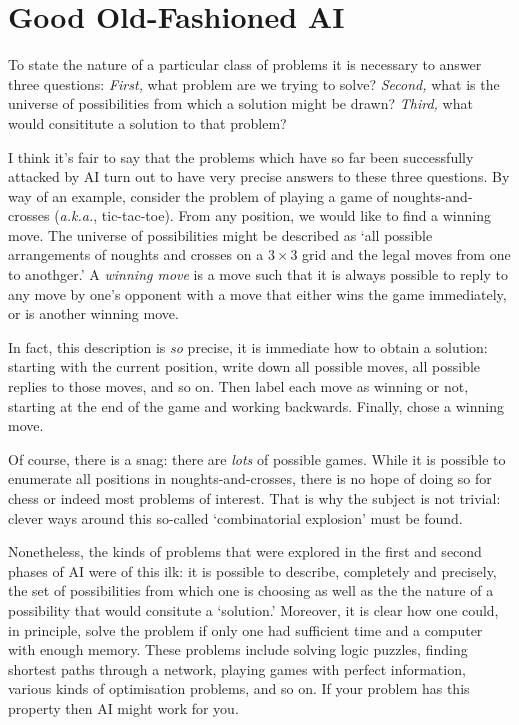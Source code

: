 \documentclass[10pt, a4paper, twocolumn]{article}
\begin{document}
\section{Good Old-Fashioned AI}

To state the nature of a particular class of problems it is necessary to answer
three questions: \emph{First,} what problem are we trying to solve?
\emph{Second,} what is the universe of possibilities from which a solution might
be drawn? \emph{Third,} what would consititute a solution to that problem?

I think it's fair to say that the problems which have so far been successfully
attacked by AI turn out to have very precise answers to these three
questions. By way of an example, consider the problem of playing a game of
noughts-and-crosses (\emph{a.k.a.}, tic-tac-toe). From any position, we would
like to find a winning move. The universe of possibilities might be described as
`all possible arrangements of noughts and crosses on a $3\times3$ grid and the legal
moves from one to anothger.' A \emph{winning move} is a move such that it is
always possible to reply to any move by one's opponent with a move that either
wins the game immediately, or is another winning move.

In fact, this description is \emph{so} precise, it is immediate how to obtain a
solution: starting with the current position, write down all possible moves, all
possible replies to those moves, and so on. Then label each move as winning or
not, starting at the end of the game and working backwards. Finally, chose a
winning move.

Of course, there is a snag: there are \emph{lots} of possible games. While it is
possible to enumerate all positions in noughts-and-crosses, there is no hope of
doing so for chess or indeed most problems of interest. That is why the subject
is not trivial: clever ways around this so-called `combinatorial explosion' must
be found.

Nonetheless, the kinds of problems that were explored in the first and second
phases of AI were of this ilk: it is possible to describe, completely and
precisely, the set of possibilities from which one is choosing as well as the
the nature of a possibility that would consitute a `solution.' Moreover, it is
clear how one could, in principle, solve the problem if only one had sufficient
time and a computer with enough memory. These problems include solving logic
puzzles, finding shortest paths through a network, playing games with perfect
information, various kinds of optimisation problems, and so on. If your problem
has this property then AI might work for you.
\end{document}
